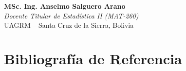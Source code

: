 \documentclass[11pt,twoside,openright]{book}
\begin{document}
\vspace{1.2cm}
\begin{flushright}
    \textbf{MSc. Ing. Anselmo Salguero Arano}\\
    \textit{Docente Titular de Estadística II (MAT-260)}\\
    UAGRM -- Santa Cruz de la Sierra, Bolivia
\end{flushright}
\clearpage

\tableofcontents
\clearpage

\mainmatter















\backmatter



\chapter*{Bibliografía de Referencia}
\end{document}
